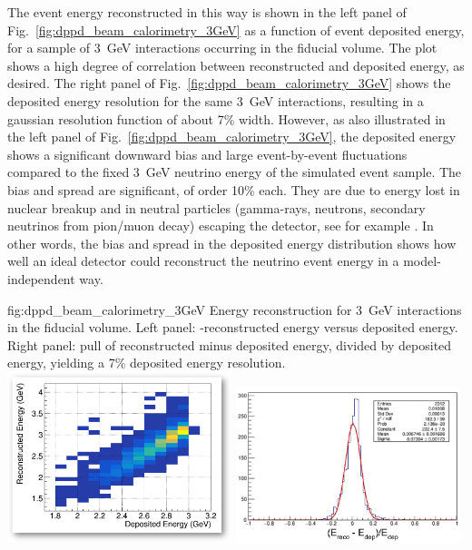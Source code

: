 The event energy reconstructed in this way is shown in the left panel of Fig.~\ref{fig:dppd_beam_calorimetry_3GeV} as a function of event deposited energy, for a sample of \SI{3}{\GeV} \nue {} interactions occurring in the \lar fiducial volume. The plot shows a high degree of correlation between reconstructed and deposited energy, as desired. The right panel of Fig.~\ref{fig:dppd_beam_calorimetry_3GeV} shows the deposited energy resolution for the same \SI{3}{\GeV} interactions, resulting in a gaussian resolution function of about \num{7}\% width. However, as also illustrated in the left panel of Fig.~\ref{fig:dppd_beam_calorimetry_3GeV}, the deposited energy shows a significant downward bias and large event-by-event fluctuations compared to the fixed \SI{3}{GeV} neutrino energy of the simulated event sample. The bias and  spread are significant, of order \num{10}\% each. They are due to energy lost in nuclear breakup and in neutral particles (gamma-rays, neutrons, secondary neutrinos from pion/muon decay) escaping the detector, see for example \cite{Friedland:2018vry}. In other words, the bias and spread in the deposited energy distribution shows how well an ideal detector could reconstruct the neutrino event energy in a model-independent way.

\begin{dunefigure}{fig:dppd_beam_calorimetry_3GeV}
{Energy reconstruction for \SI{3}{GeV} \nue {} interactions in the \lar fiducial volume. Left panel: -reconstructed energy versus deposited energy. Right panel: pull of reconstructed minus deposited energy, divided by deposited energy, yielding a \num{7}\% deposited energy resolution.}
\includegraphics[width=0.49\textwidth]{graphics/dppd_ereco_vs_edep_nuecc_3gev.png} \hfill
\includegraphics[width=0.49\textwidth]{graphics/dppd_edep_resolution_nuecc_3gev.png}
\end{dunefigure}

